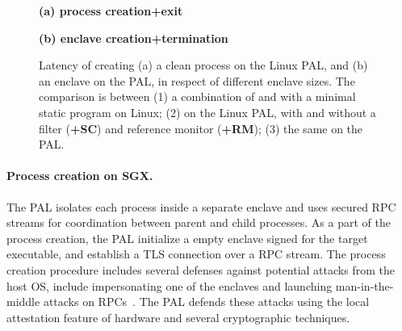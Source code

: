 \begin{figure*}[t!]
\centering
\footnotesize
{}
\parbox{0.59\textwidth}{\centering\bf (a) process creation+exit}
\parbox{0.39\textwidth}{\centering\bf (b) \sgx{} enclave creation+termination}
\caption{Latency of creating (a) a clean process on the Linux PAL, and (b) an enclave on the \sgx{} PAL, in respect of different enclave sizes.
The comparison is between (1) a combination of  and  with a minimal static program on Linux; (2)  on the Linux PAL, with and without a \seccomp{} filter ({\bf +SC}) and reference monitor ({\bf +RM}); (3) the same \hostapi{} on the \sgx{} PAL.}
\label{fig:eval:pal:proc-latency}
\end{figure*}













\paragraph{Process creation on SGX.}
The \sgx{} PAL isolates each process inside a separate enclave
and uses secured RPC streams
for coordination between parent and child processes.
As a part of the process creation,
the \sgx{} PAL initialize a empty enclave
signed for the target executable,
and establish a TLS connection over a RPC stream.
The process creation procedure
includes several defenses against potential attacks
from the host OS,
include impersonating one of the enclaves and launching man-in-the-middle attacks on RPCs~\cite{shinde17panoply}.
The \sgx{} PAL defends these attacks
using the local attestation feature of \sgx{} hardware and several cryptographic techniques.



